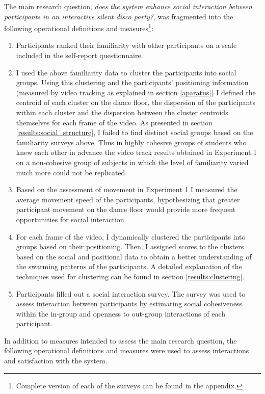 \documentclass[a4paper,11pt]{article}
\begin{document}
{The main research question, \emph{does the system enhance social interaction between participants in an interactive silent disco party?}, was fragmented into the following operational definitions and measures\footnote{Complete version of each of the surveys can be found in the appendix.}:
\begin{enumerate}
	\item \label{measure:survey:familiarity} Participants ranked their familiarity with other participants on a scale included in the self-report questionnaire.
	\item I used the above familiarity data to cluster the participants into social groups.
  Using this clustering and the participants' positioning information (measured by video tracking as explained in section \ref{aparatus}) I defined the centroid of each cluster on the dance floor, the dispersion of the participants within each cluster and the dispersion between the cluster centroids themselves for each frame of the video.
  As presented in section \ref{results:social_structure}, I failed to find distinct social groups based on the familiarity surveys above.
  Thus in highly cohesive groups of students who knew each other in advance the video track results obtained in Experiment 1 on a non-cohesive group of subjects in which the level of familiarity varied much more could not be replicated.
  \item \label{measure:movement} Based on the assessment of movement in Experiment 1 I measured the average movement speed of the participants, hypothesizing that greater participant movement on the dance floor would provide more frequent opportunities for social interaction.
  \item \label{measure:clustering} For each frame of the video, I dynamically clustered the participants into groups based on their positioning.
  Then, I assigned scores to the clusters based on the social and positional data to obtain a better understanding of the swarming patterns of the participants.
  A detailed explanation of the techniques used for clustering can be found in section \ref{results:clustering}.
	\item \label{measure:survey:social} Participants filled out a social interaction survey.
	The survey was used to assess interaction between participants by estimating social cohesiveness within the in-group and openness to out-group interactions of each participant.
\end{enumerate}
In addition to measures intended to assess the main research question, the following operational definitions and measures were used to assess interactions and satisfaction with the system.
}
\end{document}
